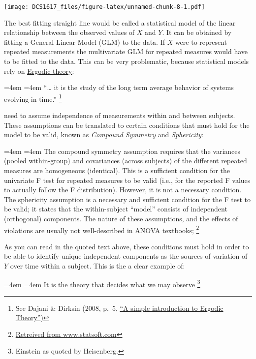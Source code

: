 \documentclass[]{book}
\let\rmarkdownfootnote\footnote%
\def\footnote{\protect\rmarkdownfootnote}
\renewenvironment{quote}{%
  \par \small \medskip \block
  \leftskip=4em \rightskip=4em%
  \noindent \ignorespaces}{%
  \par \medskip
  }
\begin{document}
\texttt{[image: DCS1617\_files/figure-latex/unnamed-chunk-8-1.pdf]}

The best fitting straight line would be called a statistical model of
the linear relationship between the observed values of \(X\) and \(Y\).
It can be obtained by fitting a General Linear Model (GLM) to the data.
If \(X\) were to represent repeated measurements the multivariate GLM
for repeated measures would have to be fitted to the data. This can be
very problematic, because statistical models rely on
\href{https://en.wikipedia.org/wiki/Ergodic_theory}{Ergodic theory}:

\begin{quote}
``\ldots{} it is the study of the long term average behavior of systems
evolving in time.'' \footnote{See Dajani \& Dirksin (2008, p.~5,
  \href{http://www.staff.science.uu.nl/~kraai101/lecturenotes2009.pdf}{``A
  simple introduction to Ergodic Theory''})}
\end{quote}

need to assume independence of measurements within and between subjects.
These assumptions can be translated to certain conditions that must hold
for the model to be valid, known as \emph{Compound Symmetry} and
\emph{Sphericity}:

\begin{quote}
The compound symmetry assumption requires that the variances (pooled
within-group) and covariances (across subjects) of the different
repeated measures are homogeneous (identical). This is a sufficient
condition for the univariate F test for repeated measures to be valid
(i.e., for the reported F values to actually follow the F distribution).
However, it is not a necessary condition. The sphericity assumption is a
necessary and sufficient condition for the F test to be valid; it states
that the within-subject ``model'' consists of independent (orthogonal)
components. The nature of these assumptions, and the effects of
violations are usually not well-described in ANOVA textbooks; \footnote{\href{https://www.statsoft.com/Textbook/ANOVA-MANOVA\#sphericity}{Retreived
  from www.statsoft.com}}
\end{quote}

As you can read in the quoted text above, these conditions must hold in
order to be able to identify unique independent components as the
sources of variation of \(Y\) over time within a subject. This is the a
clear example of:

\begin{quote}
It is the theory that decides what we may observe \footnote{Einstein as
  quoted by Heisenberg.}
\end{quote}
\end{document}
